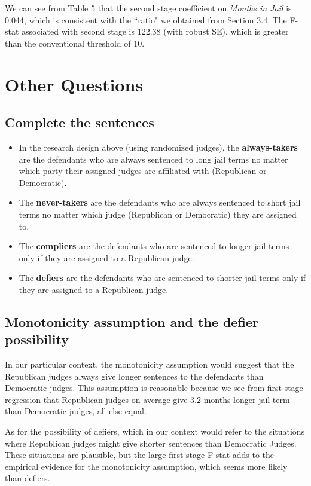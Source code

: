 \documentclass[12pt]{article}
\begin{document}
We can see from Table 5 that the second stage coefficient on \textit{Months in Jail} is 0.044, which is consistent with the ``ratio" we obtained from Section 3.4. The F-stat associated with second stage is 122.38 (with robust SE), which is greater than the conventional threshold of 10. 

\section{Other Questions }
\subsection{Complete the sentences}
\begin{itemize}
\item In the research design above (using randomized judges), the \textbf{always-takers} are the defendants who are always sentenced to long jail terms no matter which party their assigned judges are affiliated with (Republican or Democratic).
\item The \textbf{never-takers} are the defendants who are always sentenced to short jail terms no matter which judge (Republican or Democratic) they are assigned to.
\item The \textbf{compliers} are the defendants who are sentenced to longer jail terms only if they are assigned to a Republican judge.
\item The \textbf{defiers} are the defendants who are sentenced to shorter jail terms only if they are assigned to a Republican judge.
\end{itemize}

\subsection{Monotonicity assumption and the defier possibility}

In our particular context, the monotonicity assumption would suggest that the Republican judges always give longer sentences to the defendants than Democratic judges. This assumption is reasonable because we see from first-stage regression that Republican judges on average give 3.2 months longer jail term than Democratic judges, all else equal. 

As for the possibility of defiers, which in our context would refer to the situations where Republican judges might give shorter sentences than Democratic Judges. These situations are plausible, but the large first-stage F-stat adds to the empirical evidence for the monotonicity assumption, which seems more likely than defiers.
\end{document}

